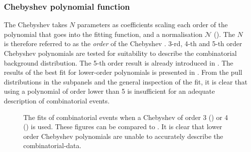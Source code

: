 \subsubsection{Chebyshev polynomial function}\label{sec:chebyshev_prefit}

The Chebyshev \PDF takes $N$ parameters as coefficients scaling each order of the polynomial that goes into the fitting function, and a normalisation $\mathcal{N}$ ().
The $N$ is therefore referred to as the \textit{order} of the Chebyshev \PDF.
3-rd, 4-th and 5-th order Chebyshev polynomials are tested for suitability to describe the combinatorial \BB background distribution.
The 5-th order result is already introduced in .
The results of the best fit for lower-order polynomials is presented in .
From the pull distributions in the subpanels and the general inspection of the fit, it is clear that using a polynomial of order lower than 5 is insufficient for an adequate description of combinatorial \BB events.

\begin{figure}[htbp!]
    \centering
    \caption{\label{fig:lower_order_chebyshev}The \Mbc fits of combinatorial \BB events when a Chebyshev \PDF of order 3 () or 4 () is used.
    These figures can be compared to .
    It is clear that lower order Chebyshev polynomials are unable to accurately describe the combinatorial-\BB data.
    }
\end{figure}


